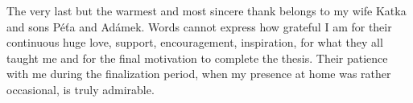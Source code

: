 \begin{itemize}
The very last but the warmest and most sincere thank belongs to my wife Katka and sons Péťa and Adámek.
Words cannot express how grateful I am for their continuous huge love, support, encouragement, inspiration, for what they all taught me and for the final motivation to complete the thesis.
Their patience with me during the finalization period, when my presence at home was rather occasional, is truly admirable.
\end{itemize}



%
%
\cleardoublepageempty
{}
\chaptermark{\contentsname}
\tableofcontents


%
%
\cleardoublepageempty
{}
{}
\chaptermark{\listfigurename}
\listoffigures


%
%
\cleardoublepageempty
{}
{}
\chaptermark{\listtablename}
\listoftables


%
%
%
